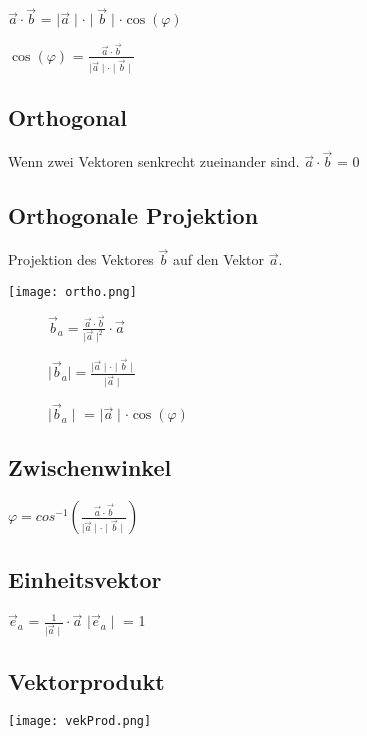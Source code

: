 \begin{multicols*}{3}
    $ \vec{a} \cdot \vec{b} $ = $ \mid \vec{a} \mid \cdot \mid \vec{b} \mid \cdot \cos(\varphi)$

    $\cos(\varphi) $ = $\frac{\vec{a} \cdot \vec{b}}{\mid \vec{a} \mid \cdot \mid \vec{b} \mid} $

    \WhiteSpace
    \subsection{Orthogonal}
    {Wenn zwei Vektoren senkrecht zueinander sind.}
    $ \vec{a} \cdot \vec{b} $ = 0
    \WhiteSpace
    \subsection{Orthogonale Projektion}
    {Projektion des Vektores $\vec{b} $ auf den Vektor $\vec{a} $.}

    \texttt{[image: ortho.png]}

    \begin{wrapfigure}{r}{4.5cm}
        \vspace{-70pt}
        $\vec{b}_a = \frac{\vec{a} \cdot  \vec{b}}{\mid \vec{a} \mid ^2} \cdot \vec{a} $

        $\mid \vec{b}_a  \mid  = \frac{\mid \vec{a} \mid \cdot \mid \vec{b} \mid}{\mid \vec{a} \mid }$


        $ \mid \vec{b}_a \mid $ = $\mid \vec{a} \mid \cdot \cos(\varphi)$

    \end{wrapfigure}



    \WhiteSpace
    \subsection{Zwischenwinkel}
    {$\varphi = cos^{-1}(\frac{\vec{a}\cdot\vec{b}}{\mid \vec{a} \mid \cdot \mid \vec{b} \mid}) $}
    \WhiteSpace
    \subsection{Einheitsvektor}
    {$\vec{e}_a $ = $\frac{1}{\mid \vec{a} \mid} \cdot \vec{a}$}
    {$\mid \vec{e}_a \mid$ = 1}

    \subsection{Vektorprodukt}

    \texttt{[image: vekProd.png]}



\end{multicols*}
